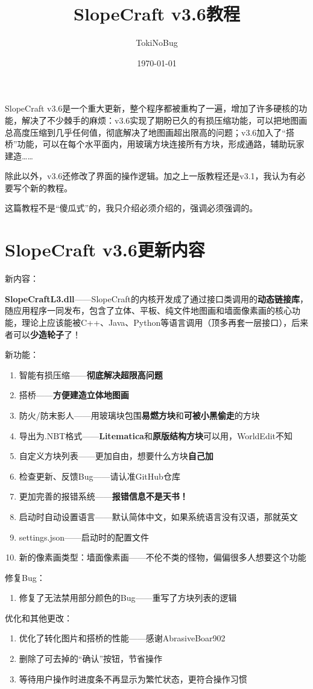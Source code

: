 \documentclass[UTF8]{ctexart}
\title{SlopeCraft v3.6教程}
\author{TokiNoBug}
\date{\today}
\begin{document}
    \maketitle
    SlopeCraft v3.6是一个重大更新，整个程序都被重构了一遍，增加了许多硬核的功能，解决了不少棘手的麻烦：v3.6实现了期盼已久的有损压缩功能，可以把地图画总高度压缩到几乎任何值，彻底解决了地图画超出限高的问题；v3.6加入了“搭桥”功能，可以在每个水平面内，用玻璃方块连接所有方块，形成通路，辅助玩家建造……
    
    除此以外，v3.6还修改了界面的操作逻辑。加之上一版教程还是v3.1，我认为有必要写个新的教程。

    这篇教程不是“傻瓜式”的，我只介绍必须介绍的，强调必须强调的。

    \pagebreak
    \section{SlopeCraft v3.6更新内容}
    新内容：

    \textbf{SlopeCraftL3.dll}——SlopeCraft的内核开发成了通过接口类调用的\textbf{动态链接库}，随应用程序一同发布，包含了立体、平板、纯文件地图画和墙面像素画的核心功能，理论上应该能被C++、Java、Python等语言调用（顶多再套一层接口），后来者可以\textbf{少造轮子}了！

    新功能：
    \begin{enumerate}
        \item 智能有损压缩——\textbf{彻底解决超限高问题}
        \item 搭桥——\textbf{方便建造立体地图画}
        \item 防火/防末影人——用玻璃块包围\textbf{易燃方块}和\textbf{可被小黑偷走}的方块
        \item 导出为.NBT格式——\textbf{Litematica}和\textbf{原版结构方块}可以用，WorldEdit不知
        \item 自定义方块列表——更加自由，想要什么方块\textbf{自己加}
        \item 检查更新、反馈Bug——请认准GitHub仓库
        \item 更加完善的报错系统——\textbf{报错信息不是天书！}
        \item 启动时自动设置语言——默认简体中文，如果系统语言没有汉语，那就英文
        \item settings.json——启动时的配置文件
        \item 新的像素画类型：墙面像素画——不伦不类的怪物，偏偏很多人想要这个功能
    \end{enumerate}
    修复Bug：
    \begin{enumerate}
        \item 修复了无法禁用部分颜色的Bug——重写了方块列表的逻辑 
    \end{enumerate}
    优化和其他更改：
    \begin{enumerate}        
        \item 优化了转化图片和搭桥的性能——感谢AbrasiveBoar902
        \item 删除了可去掉的“确认”按钮，节省操作
        \item 等待用户操作时进度条不再显示为繁忙状态，更符合操作习惯
    \end{enumerate}
\end{document}
